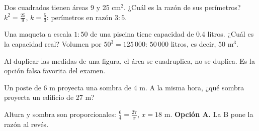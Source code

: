 \begin{ejemplo}
Dos cuadrados tienen áreas 9 y 25 cm$^2$. ¿Cuál es la razón de sus perímetros?
\solucion $k^2 = \tfrac{25}{9}$, $k = \tfrac53$: perímetros en razón $3 : 5$.
\end{ejemplo}

\begin{ejemplo}[La maqueta]
Una maqueta a escala $1 : 50$ de una piscina tiene capacidad de 0.4 litros. ¿Cuál es la capacidad real?
\solucion Volumen por $50^3 = 125\,000$: $50\,000$ litros, es decir, $50$ m$^3$.
\end{ejemplo}

\begin{trampa}
Al duplicar las medidas de una figura, el área se cuadruplica, no se duplica. Es la opción falsa favorita del examen.
\end{trampa}

\begin{reto}
Un poste de 6 m proyecta una sombra de 4 m. A la misma hora, ¿qué sombra proyecta un edificio de 27 m?
\end{reto}

\begin{retoresuelto}
Altura y sombra son proporcionales: $\tfrac{6}{4} = \tfrac{27}{x}$, $x = 18$ m. \textbf{Opción A.} La B pone la razón al
revés.
\end{retoresuelto}

